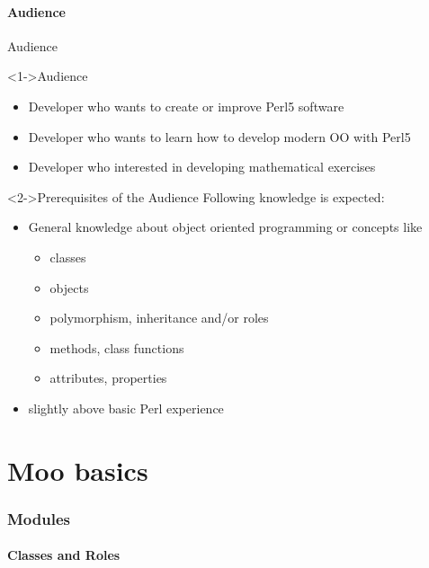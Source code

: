 \documentclass[ngerman,xcolor={table,dvipsnames},smaller,compress,hyperref={bookmarks,colorlinks}]{beamer}%
\begin{document}
\subsection{Audience}

\begin{frame}[t,fragile]{Audience}
\begin{block}<1->{Audience}
\begin{itemize}
\item Developer who wants to create or improve Perl5 software
\item Developer who wants to learn how to develop modern OO with Perl5
\item Developer who interested in developing mathematical exercises
\end{itemize}
\end{block}

\begin{block}<2->{Prerequisites of the Audience}
Following knowledge is expected:
\begin{itemize}
\item General knowledge about object oriented programming or concepts like
    \small
    \begin{itemize}
    \item classes
    \item objects
    \item polymorphism, inheritance and/or roles
    \item methods, class functions
    \item attributes, properties
    \end{itemize}
    \normalsize
\item slightly above basic Perl experience
\end{itemize}
\end{block}
\end{frame}

\part{Moo basics}

\section{Modules}

\subsection{Classes and Roles}
\end{document}
